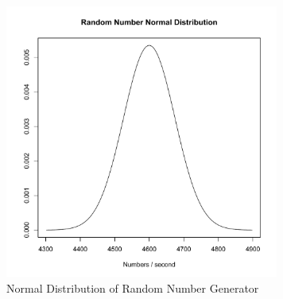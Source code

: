 \documentclass[12pt,journal,compsoc]{IEEEtran}
\begin{document}
\begin{figure}[ht!]
\centering
\includegraphics[width=90mm]{images/plotRandomNumber.pdf}
\caption{Normal Distribution of Random Number Generator}
\label{fig:plotRandomNumber}
\end{figure}
 
 
\end{document}
